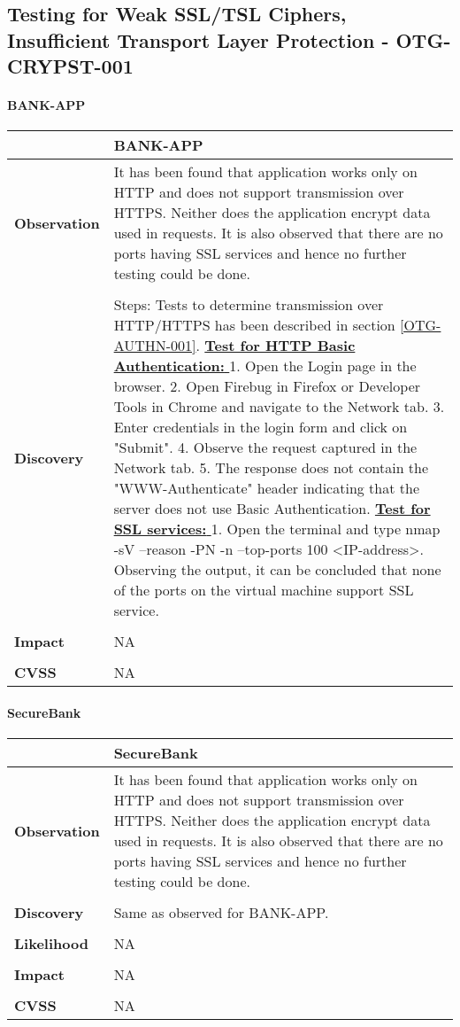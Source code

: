 \subsection{Testing for Weak SSL/TSL Ciphers, Insufficient Transport Layer Protection - OTG-CRYPST-001}
\paragraph{BANK-APP} \mbox{}
\begin{longtable*}{p{.20\textwidth} | p{.80\textwidth}}
	\hline
	& \textbf{BANK-APP} \\
	\hline
	\textbf{Observation} &
	It has been found that application works only on HTTP and does not support transmission over HTTPS. Neither does the application encrypt data used in requests. It is also observed that there are no ports having SSL services and hence no further testing could be done.
	\\\\
	\textbf{Discovery} &
	Steps:
	Tests to determine transmission over HTTP/HTTPS has been described in section \ref{OTG-AUTHN-001}.
	\underline{\textbf{Test for HTTP Basic Authentication: }}
	1. Open the Login page in the browser.
	2. Open Firebug in Firefox or Developer Tools in Chrome and navigate to the Network tab.
	3. Enter credentials in the login form and click on "Submit".
	4. Observe the request captured in the Network tab.
	5. The response does not contain the "WWW-Authenticate" header indicating that the server does not use Basic Authentication.
	\underline{\textbf{Test for SSL services: }}
	1. Open the terminal and type nmap -sV --reason -PN -n --top-ports 100 <IP-address>.
	Observing the output, it can be concluded that none of the ports on the virtual machine support SSL service.
	\\\\
	\textbf{Impact} &
	NA
	\\\\
	\textbf{CVSS} &
	NA
	\\
	\hline
\end{longtable*}
\paragraph{SecureBank} \mbox{}
\begin{longtable*}{p{.20\textwidth} | p{.80\textwidth}}
	\hline
	& \textbf{SecureBank} \\
	\hline
	\textbf{Observation} &
	It has been found that application works only on HTTP and does not support transmission over HTTPS. Neither does the application encrypt data used in requests. It is also observed that there are no ports having SSL services and hence no further testing could be done.
	\\\\
	\textbf{Discovery} &
	Same as observed for BANK-APP.
	\\\\
	\textbf{Likelihood} &
	NA
	\\\\
	\textbf{Impact} &
	NA
	\\\\
	\textbf{CVSS} &
	NA
	\\
	\hline
\end{longtable*}
\clearpage